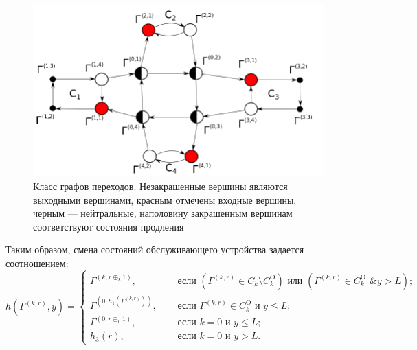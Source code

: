\documentclass[a4paper,12pt,russian]{extarticle}
\begin{document}
\begin{figure}[hb]\centering
\includegraphics[scale=0.5]{GraphScheme3.png} 
\caption{Класс графов переходов. Незакрашенные вершины являются выходными вершинами, красным отмечены входные вершины, черным --- нейтральные, наполовину закрашенным вершинам соответствуют состояния продления}
\label{GraphScheme}
\end{figure}

Таким образом, смена состояний обслуживающего устройства задается соотношением:
\begin{equation}
h(\Gamma^{(k,r)},y) = 
\begin{cases}
\Gamma^{(k,r \oplus_k 1)},& \quad \text{ если } (\Gamma^{(k,r)}\in C_k\setminus C_k^{\mathrm{O}}) \text{ или } (\Gamma^{(k,r)}\in C_k^{\mathrm{O}} \text{ \& } y>L);\\
\Gamma^{(0,h_1(\Gamma^{(k,r)}))},& \quad \text{ если } \Gamma^{(k,r)}\in C_k^{\mathrm{O}} \text{ и } y\leqslant L;\\
\Gamma^{(0,r \oplus_0 1)},& \quad \text{ если } k=0 \text{ и } y\leqslant L;\\
h_3(r),& \quad \text{ если } k=0 \text{ и } y > L.
\end{cases}
\label{hLaw}
\end{equation}
\end{document}
